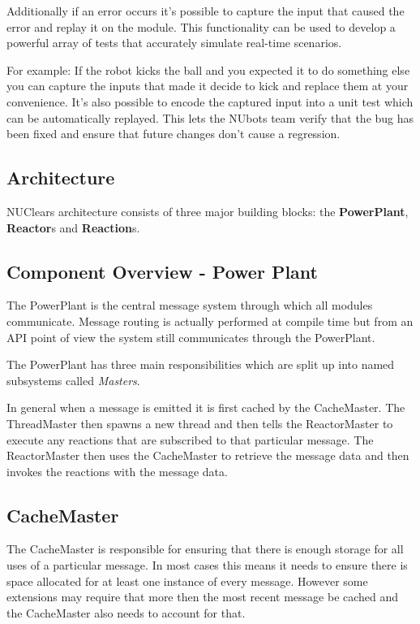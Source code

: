 \documentclass[english,12pt]{scrartcl}
\begin{document}
				Additionally if an error occurs it's possible to capture the input that caused the error and replay it on the module.
				This functionality can be used to develop a powerful array of tests that accurately simulate real-time scenarios.

				For example: If the robot kicks the ball and you expected it to do something else you can capture the inputs that made it decide to kick and replace them at your convenience.
				It's also possible to encode the captured input into a unit test which can be automatically replayed.
				This lets the NUbots team verify that the bug has been fixed and ensure that future changes don't cause a regression.

		\subsection{Architecture}
			NUClears architecture consists of three major building blocks: the \textbf{PowerPlant}, \textbf{Reactor}s and \textbf{Reaction}s.

		\subsection{Component Overview - Power Plant}
			The PowerPlant is the central message system through which all modules communicate.
			Message routing is actually performed at compile time but from an API point of view the system still communicates through the PowerPlant.

			The PowerPlant has three main responsibilities which are split up into named subsystems called \emph{Masters}.

			In general when a message is emitted it is first cached by the CacheMaster.
			The ThreadMaster then spawns a new thread and then tells the ReactorMaster to execute any reactions that are subscribed to that particular message.
			The ReactorMaster then uses the CacheMaster to retrieve the message data and then invokes the reactions with the message data.

			\subsection{CacheMaster}
				The CacheMaster is responsible for ensuring that there is enough storage for all uses of a particular message.
				In most cases this means it needs to ensure there is space allocated for at least one instance of every message.
				However some extensions may require that more then the most recent message be cached and the CacheMaster also needs to account for that.
\end{document}
